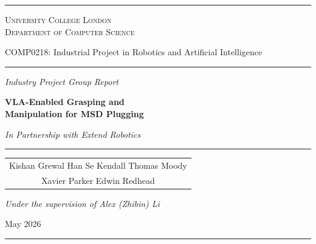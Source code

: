 \documentclass[conference]{IEEEtran}
\newcommand{\titlerule}{\noindent\textcolor{black!30}{\rule{\linewidth}{0.4pt}}}
\begin{document}
\onecolumn
\begin{titlepage}
  \centering
  \vspace*{\fill}
  \titlerule\par\vspace{0.4in}
  {\large\scshape University College London \\ Department of Computer Science}
  \par\vspace{0.3in}
  {\normalsize COMP0218: Industrial Project in Robotics and Artificial Intelligence}
  \par\vspace{0.3in}
  \titlerule\par\vspace{0.5in}
  {\normalsize\textit{Industry Project Group Report}}
  \par\vspace{0.25in}
  {\Huge\bfseries VLA-Enabled Grasping and\\[6pt]
  Manipulation for MSD Plugging}
  \par\vspace{0.15in}
  {\large\itshape In Partnership with Extend Robotics}
  \par\vspace{0.5in}
  \titlerule\par\vspace{0.45in}
  {\large
    \begin{tabular}{c}
      Kishan Grewal \quad Han Se Kendall \quad Thomas Moody \\[4pt]
      Xavier Parker \quad Edwin Redhead
    \end{tabular}
  }
  \par\vspace{0.2in}
  {\small\textit{Under the supervision of Alex (Zhibin) Li}}
  \par\vspace{0.3in}
  {\normalsize May 2026}
  \par\vspace*{\fill}
  \titlerule
\end{titlepage}

\twocolumn
\end{document}
